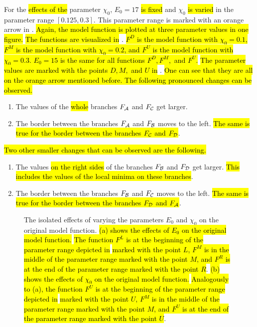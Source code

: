 For the \hl{effects of the} parameter $\chi_0$, $E_0 = 17$ \hl{is fixed} and $\chi_0$ \hl{is varied} in the parameter range $[0.125, 0.3]$.
This parameter range is marked with an orange arrow in .
\hl{
	Again, the model function is plotted at three parameter values in one figure.
}
\hl{The functions are visualized in} .
\hl{
	$F^D$ is the model function with $\chi_0 = 0.1$, $F^M$ is the model function with $\chi_0 = 0.2$, and $F^U$ is the model function with $\chi_0 = 0.3$.
	$E_0 = 15$ is the same for all functions $F^D, F^M,$ and $F^U$.
}
\hl{The parameter values are marked with the points $D, M,$ and $U$ in} .
\hl{
	One can see that they are all on the orange arrow mentioned before.
	The following pronounced changes can be observed.
}
\begin{enumerate}
	\item The values of the \hl{whole} branches $F_{\mathcal{A}}$ and $F_{\mathcal{C}}$ get larger.
	\item The border between the branches $F_{\mathcal{A}}$ and $F_{\mathcal{B}}$ moves to the left.
	      \hl{The same is true for the border between the branches $F_{\mathcal{C}}$ and $F_{\mathcal{D}}$}.
\end{enumerate}
\hl{
	Two other smaller changes that can be observed are the following.
}
\begin{enumerate}
	\item The values \hl{on the right sides} of the branches $F_{\mathcal{B}}$ and $F_{\mathcal{D}}$ get larger.
	      \hl{This includes the values of the local minima on these branches}.
	\item The border between the branches $F_{\mathcal{B}}$ and $F_{\mathcal{C}}$ moves to the left.
	      \hl{The same is true for the border between the branches $F_{\mathcal{D}}$ and $F_{\mathcal{A}}$}.
\end{enumerate}

\begin{figure}
	\centering
	\caption[The effects of single parameters on the original model function]{
		The isolated effects of varying the parameters $E_0$ and $\chi_0$ on the original model function.
		\hl{
			(a) shows the effects of $E_0$ on the original model function.
		}
		\hl{The function $F^L$ is at the beginning of the parameter range depicted in}  \hl{marked with the point $L$, $F^M$ is in the middle of the parameter range marked with the point $M$, and $F^R$ is at the end of the parameter range marked with the point $R$}.
		\hl{
			(b) shows the effects of $\chi_0$ on the original model function.
		}
		\hl{Analogously to (a), the function $F^U$ is at the beginning of the parameter range depicted in}  \hl{marked with the point $U$, $F^M$ is in the middle of the parameter range marked with the point $M$, and $F^U$ is at the end of the parameter range marked with the point $U$}.
	}
	\label{fig:setup.char.evolution.single}
\end{figure}

